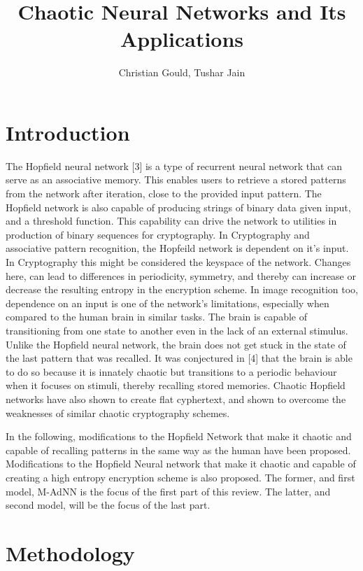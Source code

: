 \documentclass[12pt, letterpaper]{article}
\title{Chaotic Neural Networks and Its Applications}
\author{Christian Gould, Tushar Jain}
\date{}
\begin{document}
\maketitle

\newpage

\section*{Introduction}

The Hopfield neural network [3] is a type of recurrent neural network that can serve as an associative memory. This enables users to retrieve a stored patterns from the network after iteration, close to the provided input pattern. The Hopfield network is also capable of producing strings of binary data given input, and a threshold function. This capability can drive the network to utilities in production of binary sequences for cryptography. In Cryptography and associative pattern recognition, the Hopfeild network is dependent on it's input. In Cryptography this might be considered the keyspace of the network. Changes here, can lead to differences in periodicity, symmetry, and thereby can increase or decrease the resulting entropy in the encryption scheme. In image recognition too, dependence on an input is one of the network's limitations, especially when compared to the human brain in similar tasks.  The brain is capable of transitioning from one state to another even in the lack of an external stimulus. Unlike the Hopfield neural network, the brain does not get stuck in the state of the last pattern that was recalled. It was conjectured in [4] that the brain is able to do so because it is innately chaotic but transitions to a periodic behaviour when it focuses on stimuli, thereby recalling stored memories. Chaotic Hopfield networks have also shown to create flat cyphertext, and shown to overcome the weaknesses of similar chaotic cryptography schemes.  

In the following, modifications to the Hopfield Network that make it chaotic and capable of recalling patterns in the same way as the human have been proposed. Modifications to the Hopfield Neural network that make it chaotic and capable of creating a high entropy encryption scheme is also proposed. The former, and first model, M-AdNN is the focus of the first part of this review.  The latter, and second model,  will be the focus of the last part. 

\section*{Methodology}
\end{document}
